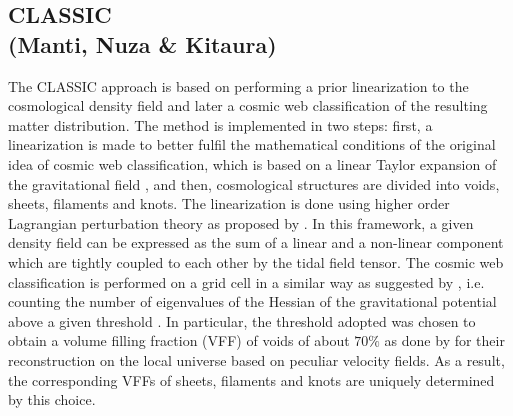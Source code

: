 \subsection{CLASSIC\\ \hskip 0.75cm (Manti, Nuza \& Kitaura)}
\label{section:CLASSIC}
 
 
The CLASSIC approach is based on performing a prior linearization to the cosmological density field and later a cosmic web classification of the resulting matter distribution. The method is implemented in two steps: first, a linearization is made to better fulfil the mathematical conditions of the original idea of cosmic web classification, which is based on a linear Taylor expansion of the gravitational field \citep[see][]{1974FizSz..24..304Z,hahn2007a}, and then, cosmological structures are divided into voids, sheets, filaments and knots. The linearization is done using higher order Lagrangian perturbation theory as proposed by \cite{2012MNRAS.425.2443K}. In this framework, a given density field can be expressed as the sum of a linear and a non-linear component which are tightly coupled to each other by the tidal field tensor. The cosmic web classification is performed on a grid cell in a similar way as suggested by \cite{hahn2007a}, i.e. counting the number of eigenvalues of the Hessian of the gravitational potential above a given threshold \citep[see also][]{forero2009}. In particular, the threshold adopted was chosen to obtain a volume filling fraction (VFF) of voids of about $70\%$ as done by \cite{2014MNRAS.445..988N} for their reconstruction on the local universe based on peculiar velocity fields. As a result, the corresponding VFFs of sheets, filaments and knots are uniquely determined by this choice. 
 
